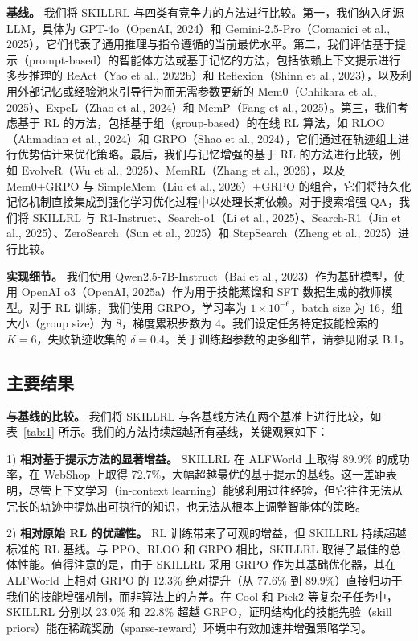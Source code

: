 \documentclass[11pt,UTF8,fontset=fandol]{ctexart}
\begin{document}
\textbf{基线。} 我们将 SKILLRL 与四类有竞争力的方法进行比较。第一，我们纳入闭源 LLM，具体为 GPT-4o（OpenAI, 2024）和 Gemini-2.5-Pro（Comanici et al., 2025），它们代表了通用推理与指令遵循的当前最优水平。第二，我们评估基于提示（prompt-based）的智能体方法或基于记忆的方法，包括依赖上下文提示进行多步推理的 ReAct（Yao et al., 2022b）和 Reflexion（Shinn et al., 2023），以及利用外部记忆或经验池来引导行为而无需参数更新的 Mem0（Chhikara et al., 2025）、ExpeL（Zhao et al., 2024）和 MemP（Fang et al., 2025）。第三，我们考虑基于 RL 的方法，包括基于组（group-based）的在线 RL 算法，如 RLOO（Ahmadian et al., 2024）和 GRPO（Shao et al., 2024），它们通过在轨迹组上进行优势估计来优化策略。最后，我们与记忆增强的基于 RL 的方法进行比较，例如 EvolveR（Wu et al., 2025）、MemRL（Zhang et al., 2026），以及 Mem0+GRPO 与 SimpleMem（Liu et al., 2026）+GRPO 的组合，它们将持久化记忆机制直接集成到强化学习优化过程中以处理长期依赖。对于搜索增强 QA，我们将 SKILLRL 与 R1-Instruct、Search-o1（Li et al., 2025）、Search-R1（Jin et al., 2025）、ZeroSearch（Sun et al., 2025）和 StepSearch（Zheng et al., 2025）进行比较。

\textbf{实现细节。} 我们使用 Qwen2.5-7B-Instruct（Bai et al., 2023）作为基础模型，使用 OpenAI o3（OpenAI, 2025a）作为用于技能蒸馏和 SFT 数据生成的教师模型。对于 RL 训练，我们使用 GRPO，学习率为 $1 \times 10^{-6}$，batch size 为 16，组大小（group size）为 8，梯度累积步数为 4。我们设定任务特定技能检索的 $K = 6$，失败轨迹收集的 $\delta = 0.4$。关于训练超参数的更多细节，请参见附录 B.1。

\subsection{主要结果}

\textbf{与基线的比较。} 我们将 SKILLRL 与各基线方法在两个基准上进行比较，如表~\ref{tab:1} 所示。我们的方法持续超越所有基线，关键观察如下：

1) \textbf{相对基于提示方法的显著增益。} SKILLRL 在 ALFWorld 上取得 89.9\% 的成功率，在 WebShop 上取得 72.7\%，大幅超越最优的基于提示的基线。这一差距表明，尽管上下文学习（in-context learning）能够利用过往经验，但它往往无法从冗长的轨迹中提炼出可执行的知识，也无法从根本上调整智能体的策略。

2) \textbf{相对原始 RL 的优越性。} RL 训练带来了可观的增益，但 SKILLRL 持续超越标准的 RL 基线。与 PPO、RLOO 和 GRPO 相比，SKILLRL 取得了最佳的总体性能。值得注意的是，由于 SKILLRL 采用 GRPO 作为其基础优化器，其在 ALFWorld 上相对 GRPO 的 12.3\% 绝对提升（从 77.6\% 到 89.9\%）直接归功于我们的技能增强机制，而非算法上的方差。在 Cool 和 Pick2 等复杂子任务中，SKILLRL 分别以 23.0\% 和 22.8\% 超越 GRPO，证明结构化的技能先验（skill priors）能在稀疏奖励（sparse-reward）环境中有效加速并增强策略学习。
\end{document}
